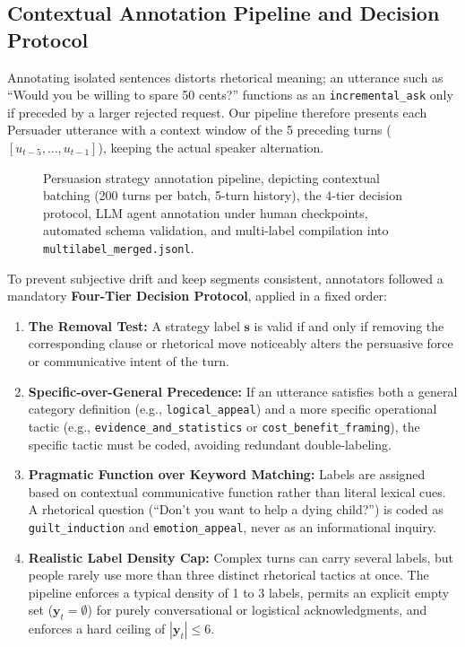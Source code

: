 \subsection{Contextual Annotation Pipeline and Decision Protocol}
Annotating isolated sentences distorts rhetorical meaning; an utterance such as ``Would you be willing to spare 50 cents?'' functions as an \texttt{incremental\_ask} only if preceded by a larger rejected request. Our pipeline therefore presents each Persuader utterance with a context window of the 5 preceding turns ($[u_{t-5}, \dots, u_{t-1}]$), keeping the actual speaker alternation.

\begin{figure}[htbp]
  \centering
  \resizebox{\textwidth}{!}{}
  \caption{Persuasion strategy annotation pipeline, depicting contextual batching (200 turns per batch, 5-turn history), the 4-tier decision protocol, LLM agent annotation under human checkpoints, automated schema validation, and multi-label compilation into \texttt{multilabel\_merged.jsonl}.}
  \label{fig:strategy_annotation_pipeline}
\end{figure}

To prevent subjective drift and keep segments consistent, annotators followed a mandatory \textbf{Four-Tier Decision Protocol}, applied in a fixed order:
\begin{enumerate}
  \item \textbf{The Removal Test:} A strategy label $\mathbf{s}$ is valid if and only if removing the corresponding clause or rhetorical move noticeably alters the persuasive force or communicative intent of the turn.
  \item \textbf{Specific-over-General Precedence:} If an utterance satisfies both a general category definition (e.g., \texttt{logical\_appeal}) and a more specific operational tactic (e.g., \texttt{evidence\_and\_statistics} or \texttt{cost\_benefit\_framing}), the specific tactic must be coded, avoiding redundant double-labeling.
  \item \textbf{Pragmatic Function over Keyword Matching:} Labels are assigned based on contextual communicative function rather than literal lexical cues. A rhetorical question (``Don't you want to help a dying child?'') is coded as \texttt{guilt\_induction} and \texttt{emotion\_appeal}, never as an informational inquiry.
  \item \textbf{Realistic Label Density Cap:} Complex turns can carry several labels, but people rarely use more than three distinct rhetorical tactics at once. The pipeline enforces a typical density of 1 to 3 labels, permits an explicit empty set ($\mathbf{y}_t = \emptyset$) for purely conversational or logistical acknowledgments, and enforces a hard ceiling of $|\mathbf{y}_t| \le 6$.
\end{enumerate}

